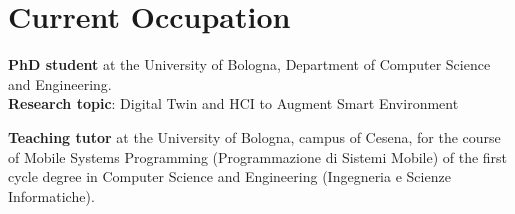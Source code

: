 \section{Current Occupation}

\textbf{PhD student} at the University of Bologna, Department of Computer Science and Engineering.\\
\textbf{Research topic}: Digital Twin and HCI to Augment Smart Environment

\textbf{Teaching tutor} at the University of Bologna, campus of Cesena, for the course of Mobile Systems Programming (Programmazione di Sistemi Mobile) of the first cycle degree in Computer Science and Engineering (Ingegneria e Scienze Informatiche).

\vspace{20pt}
